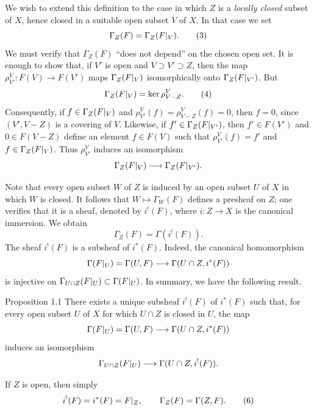 We wish to extend this definition to the case in which $Z$ is a
\emph{locally closed} subset of $X$, hence closed in a suitable open subset
$V$ of $X$.  In that case we set
\begin{equation}
  \Gamma_Z(F)=\Gamma_Z(F\vert_{V}).
  \tag{3}\label{eq:I.3}
\end{equation}
We must verify that $\Gamma_Z(F)$ ``does not depend'' on the chosen open
set.  It is enough to show that, if $V'$ is open and
$V\supset V'\supset Z$, then the map
$\rho^V_{V'}:F(V)\to F(V')$ maps
$\Gamma_Z(F\vert_{V})$ isomorphically onto
$\Gamma_Z(F\vert_{V'})$.  But
\begin{equation}
  \Gamma_Z(F\vert_{V})=\ker\rho^V_{V-Z}.
  \tag{4}\label{eq:I.4}
\end{equation}
Consequently, if $f\in\Gamma_Z(F\vert_{V})$ and
$\rho^V_{V'}(f)=\rho^V_{V-Z}(f)=0$, then $f=0$, since
$(V',V-Z)$ is a covering of $V$.  Likewise, if
$f'\in\Gamma_Z(F\vert_{V'})$, then $f'\in F(V')$ and
$0\in F(V-Z)$ define an element $f\in F(V)$ such that
$\rho^V_{V'}(f)=f'$ and $f\in\Gamma_Z(F\vert_{V})$.
Thus $\rho^V_{V'}$ induces an isomorphism
\[
  \Gamma_Z(F\vert_{V})\longrightarrow
  \Gamma_Z(F\vert_{V'}).
\]

Note that every open subset $W$ of $Z$ is induced by an open subset $U$
of $X$ in which $W$ is closed.  It follows that
$W\mapsto\Gamma_W(F)$ defines a presheaf on $Z$; one verifies that it is
a sheaf, denoted by $i^!(F)$, where $i:Z\to X$ is the canonical
immersion.  We obtain
\begin{equation}
  \Gamma_Z(F)=\Gamma(i^!(F)).
  \tag{5}\label{eq:I.5}
\end{equation}
The sheaf $i^!(F)$ is a subsheaf of $i^*(F)$.  Indeed, the canonical
homomorphism
\[
  \Gamma(F\vert_{U})=\Gamma(U,F)\longrightarrow
  \Gamma(U\cap Z,i^*(F))
\]
is injective on
$\Gamma_{U\cap Z}(F\vert_{U})\subset\Gamma(F\vert_{U})$.
In summary, we have the following result.

\begin{sgastatement}{Proposition 1.1}
There exists a unique subsheaf $i^!(F)$ of $i^*(F)$ such that, for every
open subset $U$ of $X$ for which $U\cap Z$ is closed in $U$, the map
\[
  \Gamma(F\vert_{U})=\Gamma(U,F)\longrightarrow
  \Gamma(U\cap Z,i^*(F))
\]
induces an isomorphism
\[
  \Gamma_{U\cap Z}(F\vert_{U})\longrightarrow
  \Gamma(U\cap Z,i^!(F)).
\]
\end{sgastatement}

If $Z$ is open, then simply
\begin{equation}
  i^!(F)=i^*(F)=F\vert_{Z},
  \qquad \Gamma_Z(F)=\Gamma(Z,F).
  \tag{6}\label{eq:I.6}
\end{equation}

